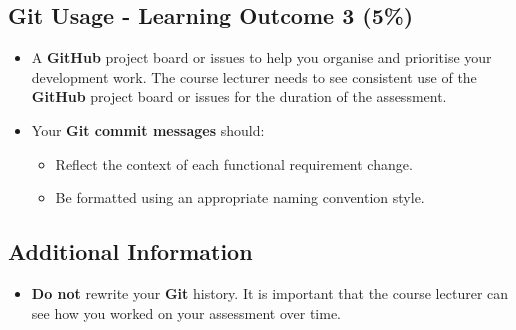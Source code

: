 \documentclass{article}
\begin{document}
\subsection*{Git Usage - Learning Outcome 3 (5\%)}
\begin{itemize}
	\item A \textbf{GitHub} project board or issues to help you organise and prioritise your development work. The course lecturer needs to see consistent use of the \textbf{GitHub} project board or issues for the duration of the assessment.
    \item Your \textbf{Git commit messages} should:
    \begin{itemize}
      \item Reflect the context of each functional requirement change.
      \item Be formatted using an appropriate naming convention style.
    \end{itemize}
\end{itemize}

\subsection*{Additional Information}
\begin{itemize}
	\item \textbf{Do not} rewrite your \textbf{Git} history. It is important that the course lecturer can see how you worked on your assessment over time.
\end{itemize}
\end{document}
